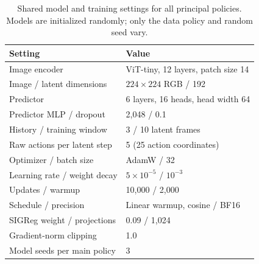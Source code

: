 \begin{table}[t]
\centering
\caption{Shared model and training settings for all principal policies. Models are initialized randomly; only the data policy and random seed vary.}
\label{tab:training}
\footnotesize
\setlength{\tabcolsep}{5pt}
\renewcommand{\arraystretch}{1.12}
\begin{tabular}{p{}p{}}
\toprule
Setting & Value \\
\midrule
Image encoder & ViT-tiny, 12 layers, patch size 14 \\
Image / latent dimensions & $224\times224$ RGB / 192 \\
Predictor & 6 layers, 16 heads, head width 64 \\
Predictor MLP / dropout & 2,048 / 0.1 \\
History / training window & 3 / 10 latent frames \\
Raw actions per latent step & 5 (25 action coordinates) \\
Optimizer / batch size & AdamW / 32 \\
Learning rate / weight decay & $5\times10^{-5}$ / $10^{-3}$ \\
Updates / warmup & 10,000 / 2,000 \\
Schedule / precision & Linear warmup, cosine / BF16 \\
SIGReg weight / projections & 0.09 / 1,024 \\
Gradient-norm clipping & 1.0 \\
Model seeds per main policy & 3 \\
\bottomrule
\end{tabular}
\end{table}
